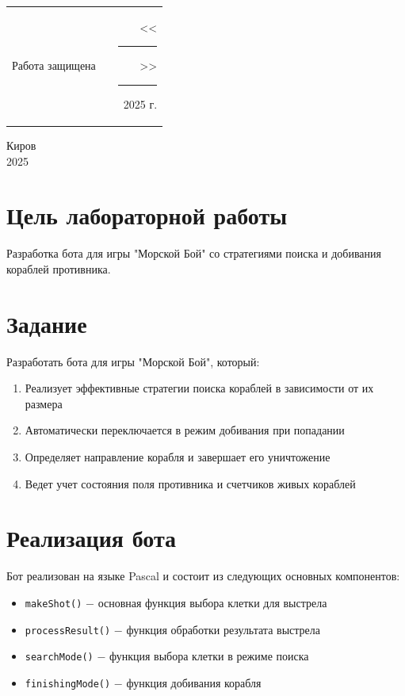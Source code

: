\documentclass[oneside,a4paper,14pt]{extarticle}
\begin{document}
\noindent
\begin{tabular}{lp{58mm}r}
  Работа защищена &  & \hspace{13mm}<<\rule[-1mm]{5mm}{0.10mm}\/>>\rule[-1mm]{30mm}{0.10mm}\ 2025 г.
\end{tabular}
\vfill

\begin{center}
  Киров\\
  2025
\end{center}

\newpage\thispagestyle{plain}

\section*{Цель лабораторной работы}
Разработка бота для игры "Морской Бой" со стратегиями поиска и добивания кораблей противника.

\section*{Задание}
Разработать бота для игры "Морской Бой", который:
\begin{enumerate}
  \item Реализует эффективные стратегии поиска кораблей в зависимости от их размера
  \item Автоматически переключается в режим добивания при попадании
  \item Определяет направление корабля и завершает его уничтожение
  \item Ведет учет состояния поля противника и счетчиков живых кораблей
\end{enumerate}

\section*{Реализация бота}

Бот реализован на языке Pascal и состоит из следующих основных компонентов:

\begin{itemize}
  \item[$-$] \texttt{makeShot()} $-$ основная функция выбора клетки для выстрела
  \item[$-$] \texttt{processResult()} $-$ функция обработки результата выстрела
  \item[$-$] \texttt{searchMode()} $-$ функция выбора клетки в режиме поиска
  \item[$-$] \texttt{finishingMode()} $-$ функция добивания корабля
\end{itemize}
\end{document}

